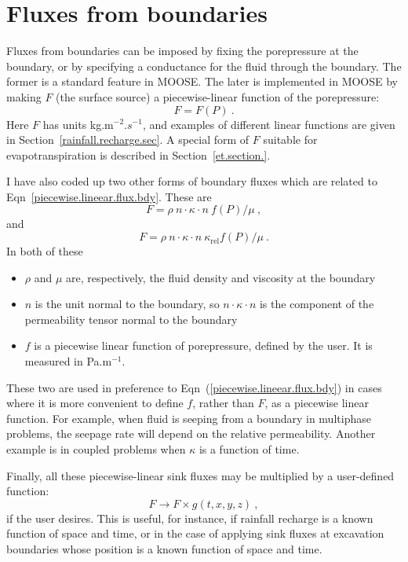 \documentclass[]{scrreprt}
\begin{document}
\section{Fluxes from boundaries}
\label{fluxes.from.bdy.sec}

Fluxes from boundaries can be imposed by fixing the porepressure at
the boundary, or by specifying a conductance for the fluid through the
boundary.  The former is a standard feature in MOOSE.  The later is
implemented in MOOSE by making $F$ (the surface source) a
piecewise-linear function of the porepressure:
\begin{equation}
F = F(P) \ .
\label{piecewise.lineear.flux.bdy}
\end{equation}
Here $F$ has units kg.m$^{-2}.s^{-1}$, and examples of different
linear functions are given in Section~\ref{rainfall.recharge.sec}.  A
special form of $F$ suitable for evapotranspiration is described in
Section~\ref{et.section.}.

I have also coded up two other forms of
boundary fluxes which are related to
Eqn~\ref{piecewise.lineear.flux.bdy}.  These are
\begin{equation}
F = \rho\ n\cdot\kappa\cdot n \ f(P)/\mu \ ,
\end{equation}
and
\begin{equation}
F = \rho \ n\cdot\kappa\cdot n\ \kappa_{\mathrm{rel}} f(P)/\mu \ .
\end{equation}
In both of these
\begin{itemize}
\item $\rho$ and $\mu$ are, respectively, the fluid density and
  viscosity at the boundary
\item $n$ is the unit normal to the boundary, so $n \cdot \kappa \cdot
  n$ is the component of the permeability tensor normal to the
  boundary
\item $f$ is a piecewise linear function of porepressure, defined by
  the user.  It is measured in Pa.m$^{-1}$.
\end{itemize}
These two are used in preference to
Eqn~(\ref{piecewise.lineear.flux.bdy}) in cases where it is more
convenient to define $f$, rather than $F$, as a piecewise linear
function.  For example, when fluid is seeping from a boundary in
multiphase problems, the seepage rate will depend on the relative
permeability.  Another example is in coupled problems when $\kappa$ is
a function of time.

Finally, all these piecewise-linear sink fluxes may be multiplied by a
user-defined function: 
\begin{equation}
F \rightarrow F\times g(t, x, y, z) \ ,
\end{equation}
if the user desires.  This is useful, for instance, if rainfall
recharge is a known function of space and time, or in the case of
applying sink fluxes at excavation boundaries whose position is a
known function of space and time.
\end{document}
